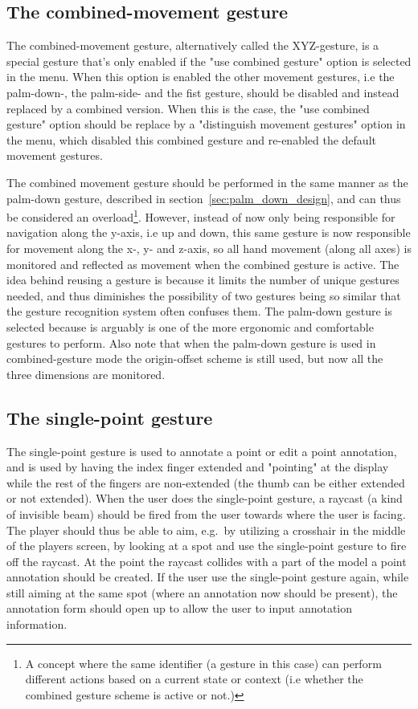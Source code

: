 \subsection{The combined-movement gesture}
\label{sec:combined-movement}
The combined-movement gesture, alternatively called the XYZ-gesture, is a special gesture that's only enabled if the "use combined gesture" option is selected in the menu.
When this option is enabled the other movement gestures, i.e the palm-down-, the palm-side- and the fist gesture, should be disabled and instead replaced by a combined version. 
When this is the case, the "use combined gesture" option should be replace by a "distinguish movement gestures" option in the menu, 
which disabled this combined gesture and re-enabled the default movement gestures. 

The combined movement gesture should be performed in the same manner as the palm-down gesture, described in section~\ref{sec:palm_down_design}, 
and can thus be considered an overload\footnote{A concept where the same identifier (a gesture in this case) can perform different actions based on a current state or context (i.e whether the combined gesture scheme is active or not.)}.
However, instead of now only being responsible for navigation along the y-axis, i.e up and down, this same gesture is now responsible for movement along the x-, y- and z-axis, so
all hand movement (along all axes) is monitored and reflected as movement when the combined gesture is active.
The idea behind reusing a gesture is because it limits the number of unique gestures needed, and thus diminishes the possibility of two gestures being so similar 
that the gesture recognition system often confuses them. The palm-down gesture is selected because is arguably is one of the more ergonomic and comfortable gestures to perform. 
Also note that when the palm-down gesture is used in combined-gesture mode the origin-offset scheme is still used, but now all the three dimensions are monitored. 

\subsection{The single-point gesture}
The single-point gesture is used to annotate a point or edit a point annotation, and is used by having the index finger extended and "pointing" at the display while the 
rest of the fingers are non-extended (the thumb can be either extended or not extended). 
When the user does the single-point gesture, a raycast (a kind of invisible beam) should be fired from the user towards where the user is facing.
The player should thus be able to aim, e.g.~by utilizing a crosshair in the middle of the players screen, by looking at a spot and use the single-point gesture to fire off 
the raycast. At the point the raycast collides with a part of the model a point annotation should be created. If the user use the single-point gesture again, while
still aiming at the same spot (where an annotation now should be present), the annotation form should open up to allow the user to input annotation information. 

